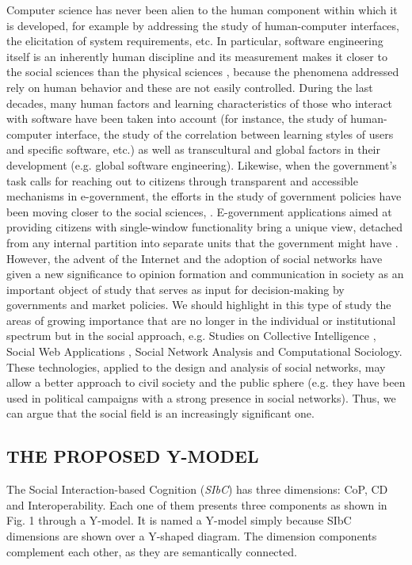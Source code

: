 \documentclass[10pt,twocolumn,ieeetran]{article}
\begin{document}
Computer science has never been alien to the human component within which it is developed, for example by addressing the study of human-computer interfaces, the elicitation of system requirements, etc. In particular, software engineering itself is an inherently human discipline and its measurement makes it closer to the social sciences than the physical sciences \cite{Morasca},  because the phenomena addressed rely on human behavior and these are not easily controlled.
During the last decades,  many human factors and learning characteristics of those who interact with software have been taken into account (for instance, the study of human-computer interface, the study of the correlation between learning styles of users and specific software, etc.) as well as transcultural and global factors in their development (e.g. global software engineering).
Likewise, when the government's task calls for reaching  out to citizens through transparent and accessible mechanisms in e-government,  the efforts in the study of government policies have been moving closer to the social sciences, \cite{Graham}. E-government applications aimed at providing citizens with single-window functionality bring a unique view, detached from any internal partition into separate units that the government might  have \cite{OECD}.
However, the advent of the Internet and the adoption of social networks have given a new significance to  opinion formation and communication in society as an important object of study that serves as input for decision-making by governments and market policies.
We should highlight in this type of study the areas of growing importance that are no longer in the individual or institutional spectrum but in the social approach, e.g. Studies on Collective Intelligence \cite{Seragan}, Social Web Applications \cite{Bell}, Social Network Analysis \cite{Tsvetovat} and Computational Sociology. These technologies, applied to the design and analysis of social networks, may allow a better approach to civil society and the public sphere (e.g. they have been used in political campaigns with a strong presence in social networks). Thus, we can argue that the social field is an increasingly significant one.

\subsection{THE PROPOSED Y-MODEL}

The Social Interaction-based Cognition ({\it SIbC}) has three dimensions: CoP, CD and Interoperability. Each one of them presents three components as shown in  Fig. 1  through a Y-model. It is named a Y-model simply because SIbC dimensions  are shown over a Y-shaped diagram. The dimension components complement each other, as they are semantically connected.
\end{document}
